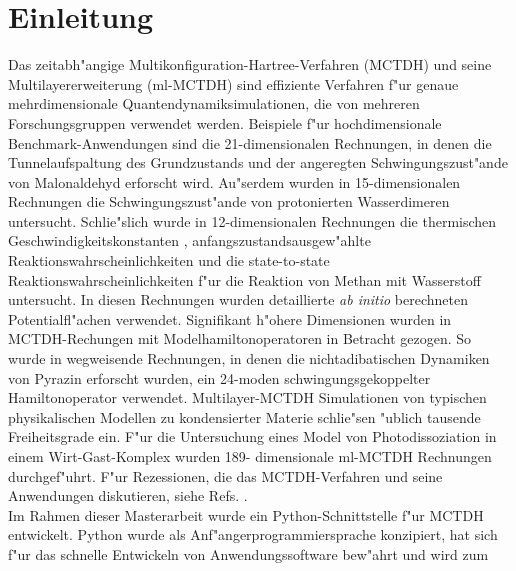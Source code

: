 \chapter{Einleitung}

Das zeitabh"angige Multikonfiguration-Hartree-Verfahren (MCTDH) 
\cite{MMC, MMC1} und seine Multilayererweiterung (ml-MCTDH)
\cite{WT3, Mreview2} 
sind effiziente Verfahren f"ur genaue mehrdimensionale Quantendynamiksimulationen,
die von mehreren Forschungsgruppen verwendet werden. 
\cite{MCTDHex1, WestPNM, MCTDHex2, W1, MCTDHex4, MCTDHex5, MCTDHex6, MCTDHex7, MCTDHex8,
MCTDHex9, MCTDHex10, MCTDHex11, MCTDHex12, MCTDHex13, MCTDHex14, MCTDHex15, MCTDHex16, MCTDHex17,MCTDHex18} 
Beispiele f"ur hochdimensionale 
Benchmark-Anwendungen sind die 21-dimensionalen Rechnungen, in denen die Tunnelaufspaltung des
Grundzustands \cite{CVM, HCVM, HaM1, MAMCTDH, HaM2, MAMCTDH2} und der angeregten \cite{HCVM, HaM1, MAMCTDH, HaM2, MAMCTDH2}
Schwingungszust"ande von Malonaldehyd erforscht wird. 
Au"serdem wurden in 15-dimen\-sio\-nalen Rechnungen die Schwingungszust"ande von protonierten 
Wasserdimeren \cite{H5O2+MCTDH, H5O2+MCTDH2, H5O2+MCTDH3, H5O2+MCTDH4, H5O2+MCTDH5} untersucht. 
Schlie"s\-lich wurde in 12-dimensionalen Rechnungen die thermischen 
Geschwindig\-keitskonstanten \cite{HM1, HM2, WWM, SM, vHNM,NvHM}, anfangszustandsausgew"ahlte Reaktionswahrscheinlichkeiten
\cite{SM02, SM04, WeM5, WeM6, WeM8} und die 
state-to-state Reaktionswahrscheinlichkeiten \cite{WeM7} f"ur die Reaktion von Methan mit Wasserstoff 
untersucht. In diesen Rechnungen wurden detaillierte \textit{ab initio} berechneten
Potentialfl"achen verwendet. Signifikant h"ohere Dimensionen wurden in MCTDH-Rechungen mit 
Modelhamiltonoperatoren in Betracht gezogen. So wurde in wegweisende Rechnungen, in denen  
die nichtadibatischen Dynamiken von Pyrazin erforscht wurden, ein 24-moden 
schwingungsgekoppelter Hamiltonoperator \cite{WMC, WMC2, RWMC} verwendet. Multilayer-MCTDH Simulationen von typischen
physikalischen Modellen \cite{WT3, W1, WST, KCBWT, CTW2, WPHT} zu kondensierter Materie schlie"sen "ublich tausende Freiheitsgrade ein.
F"ur die Untersuchung eines Model von Photodissoziation in einem Wirt-Gast-Komplex wurden 189-
dimensionale ml-MCTDH Rechnungen \cite{WBRSM} durchgef"uhrt. F"ur Rezessionen, die das MCTDH-Verfahren und
seine Anwendungen diskutieren, siehe Refs. \cite{MCTDHreview, MCTDHreview2, HMreview1, MCTDHbook,Mreview2011, MCTDHreview3}.
\\ Im Rahmen dieser Masterarbeit wurde ein Python-Schnittstelle f"ur MCTDH entwickelt.
Python wurde als Anf"angerprogrammiersprache konzipiert, hat sich f"ur das schnelle Entwickeln von Anwendungssoftware bew"ahrt und wird zum 
